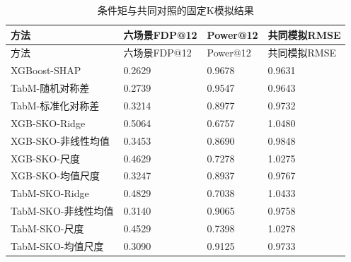 \documentclass{sufethesismas}
\begin{document}
{
\footnotesize
\begin{longtable}[]{@{}llll@{}}
\caption{条件矩与共同对照的固定K模拟结果}\tabularnewline
\toprule\noalign{}
方法 & 六场景FDP@12 & Power@12 & 共同模拟RMSE \\
\midrule\noalign{}
\endfirsthead
\toprule\noalign{}
方法 & 六场景FDP@12 & Power@12 & 共同模拟RMSE \\
\midrule\noalign{}
\endhead
\bottomrule\noalign{}
\endlastfoot
XGBoost-SHAP & 0.2629 & 0.9678 & 0.9631 \\
TabM-随机对称差 & 0.2739 & 0.9547 & 0.9643 \\
TabM-标准化对称差 & 0.3214 & 0.8977 & 0.9732 \\
XGB-SKO-Ridge & 0.5064 & 0.6757 & 1.0480 \\
XGB-SKO-非线性均值 & 0.3453 & 0.8690 & 0.9848 \\
XGB-SKO-尺度 & 0.4629 & 0.7278 & 1.0275 \\
XGB-SKO-均值尺度 & 0.3247 & 0.8937 & 0.9767 \\
TabM-SKO-Ridge & 0.4829 & 0.7038 & 1.0433 \\
TabM-SKO-非线性均值 & 0.3140 & 0.9065 & 0.9758 \\
TabM-SKO-尺度 & 0.4529 & 0.7398 & 1.0278 \\
TabM-SKO-均值尺度 & 0.3090 & 0.9125 & 0.9733 \\
\end{longtable}
}
\end{document}
